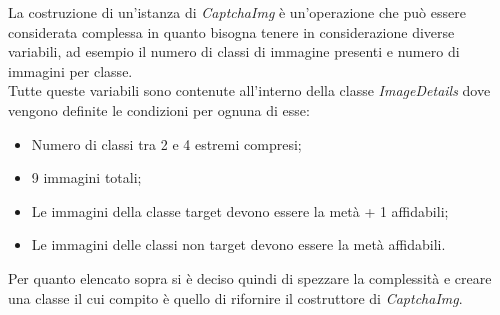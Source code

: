 La costruzione di un'istanza di \textit{CaptchaImg} è un'operazione che può essere considerata complessa in quanto bisogna tenere in considerazione diverse variabili, ad esempio il numero di classi di immagine presenti e numero di immagini per classe. \\
Tutte queste variabili sono contenute all'interno della classe \textit{ImageDetails} dove vengono definite le condizioni per ognuna di esse:
\begin{itemize}
    \item Numero di classi tra 2 e 4 estremi compresi;
    \item 9 immagini totali;
    \item Le immagini della classe target devono essere la metà + 1 affidabili;
    \item Le immagini delle classi non target devono essere la metà affidabili.
\end{itemize}
Per quanto elencato sopra si è deciso quindi di spezzare la complessità e creare una classe il cui compito è quello di rifornire il costruttore di \textit{CaptchaImg}. 